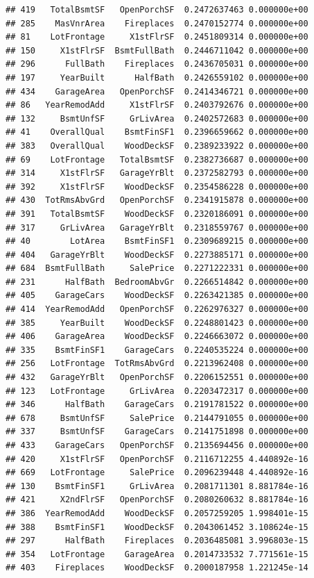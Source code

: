 \documentclass[american,]{article}
\theoremstyle{definition}
\theoremstyle{definition}
\theoremstyle{definition}
\theoremstyle{remark}
\begin{document}
\begin{verbatim}
## 419   TotalBsmtSF   OpenPorchSF  0.2472637463 0.000000e+00
## 285    MasVnrArea    Fireplaces  0.2470152774 0.000000e+00
## 81    LotFrontage     X1stFlrSF  0.2451809314 0.000000e+00
## 150     X1stFlrSF  BsmtFullBath  0.2446711042 0.000000e+00
## 296      FullBath    Fireplaces  0.2436705031 0.000000e+00
## 197     YearBuilt      HalfBath  0.2426559102 0.000000e+00
## 434    GarageArea   OpenPorchSF  0.2414346721 0.000000e+00
## 86   YearRemodAdd     X1stFlrSF  0.2403792676 0.000000e+00
## 132     BsmtUnfSF     GrLivArea  0.2402572683 0.000000e+00
## 41    OverallQual    BsmtFinSF1  0.2396659662 0.000000e+00
## 383   OverallQual    WoodDeckSF  0.2389233922 0.000000e+00
## 69    LotFrontage   TotalBsmtSF  0.2382736687 0.000000e+00
## 314     X1stFlrSF   GarageYrBlt  0.2372582793 0.000000e+00
## 392     X1stFlrSF    WoodDeckSF  0.2354586228 0.000000e+00
## 430  TotRmsAbvGrd   OpenPorchSF  0.2341915878 0.000000e+00
## 391   TotalBsmtSF    WoodDeckSF  0.2320186091 0.000000e+00
## 317     GrLivArea   GarageYrBlt  0.2318559767 0.000000e+00
## 40        LotArea    BsmtFinSF1  0.2309689215 0.000000e+00
## 404   GarageYrBlt    WoodDeckSF  0.2273885171 0.000000e+00
## 684  BsmtFullBath     SalePrice  0.2271222331 0.000000e+00
## 231      HalfBath  BedroomAbvGr  0.2266514842 0.000000e+00
## 405    GarageCars    WoodDeckSF  0.2263421385 0.000000e+00
## 414  YearRemodAdd   OpenPorchSF  0.2262976327 0.000000e+00
## 385     YearBuilt    WoodDeckSF  0.2248801423 0.000000e+00
## 406    GarageArea    WoodDeckSF  0.2246663072 0.000000e+00
## 335    BsmtFinSF1    GarageCars  0.2240535224 0.000000e+00
## 256   LotFrontage  TotRmsAbvGrd  0.2213962408 0.000000e+00
## 432   GarageYrBlt   OpenPorchSF  0.2206152551 0.000000e+00
## 123   LotFrontage     GrLivArea  0.2203472317 0.000000e+00
## 346      HalfBath    GarageCars  0.2191781522 0.000000e+00
## 678     BsmtUnfSF     SalePrice  0.2144791055 0.000000e+00
## 337     BsmtUnfSF    GarageCars  0.2141751898 0.000000e+00
## 433    GarageCars   OpenPorchSF  0.2135694456 0.000000e+00
## 420     X1stFlrSF   OpenPorchSF  0.2116712255 4.440892e-16
## 669   LotFrontage     SalePrice  0.2096239448 4.440892e-16
## 130    BsmtFinSF1     GrLivArea  0.2081711301 8.881784e-16
## 421     X2ndFlrSF   OpenPorchSF  0.2080260632 8.881784e-16
## 386  YearRemodAdd    WoodDeckSF  0.2057259205 1.998401e-15
## 388    BsmtFinSF1    WoodDeckSF  0.2043061452 3.108624e-15
## 297      HalfBath    Fireplaces  0.2036485081 3.996803e-15
## 354   LotFrontage    GarageArea  0.2014733532 7.771561e-15
## 403    Fireplaces    WoodDeckSF  0.2000187958 1.221245e-14

\end{verbatim}
\end{document}
